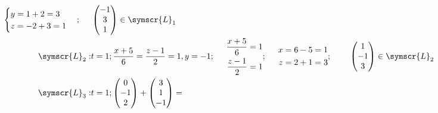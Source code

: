 \documentclass{article}
\def\fancyL{\symscr{L}}
\begin{document}
\begin{enumerate}
\begin{enumerate}[label=\listAlph]
\[\begin{aligned}
\begin{cases}
                        y = 1 + 2 = 3 \\
                        z = -2 + 3 = 1
                    \end{cases};
                    \hspace{0.5cm}
                    &
                    \begin{pmatrix}
                        -1 \\ 3 \\ 1
                    \end{pmatrix}
                    \in \fancyL_1
                    \\
                    \fancyL_2:&
                    t = 1;
                    \frac{x + 5}{6} =
                    \frac{z - 1}{2} = 1,
                    y = -1;
                    \hspace{0.5cm}
                    \begin{aligned}
                        \frac{x + 5}{6} &= 1 \\
                        \frac{z - 1}{2} &= 1 \\
                    \end{aligned};
                    \hspace{0.5cm}
                    \begin{aligned}
                        x &= 6 - 5 = 1 \\
                        z &= 2 + 1 = 3 \\
                    \end{aligned};
                    \hspace{0.5cm}
                    &
                    \begin{pmatrix}
                        1 \\ -1 \\ 3
                    \end{pmatrix}
                    \in \fancyL_2
                    \\
                    \fancyL_3:&
                    t = 1;
                    \begin{pmatrix}0 \\ -1 \\ 2\end{pmatrix}
                    +
                    \begin{pmatrix}3 \\ 1 \\ -1\end{pmatrix}
                    =

\end{aligned}\]
\end{enumerate}
\end{enumerate}
\end{document}
